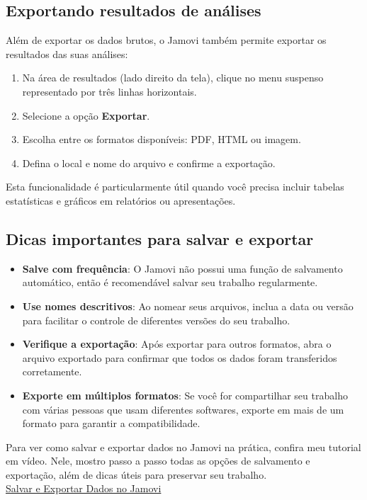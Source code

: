 \subsection{Exportando resultados de análises}

Além de exportar os dados brutos, o Jamovi também permite exportar os resultados das suas análises:

\begin{enumerate}
    \item Na área de resultados (lado direito da tela), clique no menu suspenso representado por três linhas horizontais.
    \item Selecione a opção \textbf{Exportar}.
    \item Escolha entre os formatos disponíveis: PDF, HTML ou imagem.
    \item Defina o local e nome do arquivo e confirme a exportação.
\end{enumerate}

Esta funcionalidade é particularmente útil quando você precisa incluir tabelas estatísticas e gráficos em relatórios ou apresentações.

\subsection{Dicas importantes para salvar e exportar}

\begin{itemize}
    \item \textbf{Salve com frequência}: O Jamovi não possui uma função de salvamento automático, então é recomendável salvar seu trabalho regularmente.
    \item \textbf{Use nomes descritivos}: Ao nomear seus arquivos, inclua a data ou versão para facilitar o controle de diferentes versões do seu trabalho.
    \item \textbf{Verifique a exportação}: Após exportar para outros formatos, abra o arquivo exportado para confirmar que todos os dados foram transferidos corretamente.
    \item \textbf{Exporte em múltiplos formatos}: Se você for compartilhar seu trabalho com várias pessoas que usam diferentes softwares, exporte em mais de um formato para garantir a compatibilidade.
\end{itemize}

\begin{tcolorbox}[colback=white,colframe=red,title={\faPlayCircle \ Dica de Conteúdo}]
  Para ver como salvar e exportar dados no Jamovi na prática, confira meu tutorial em vídeo. Nele, mostro passo a passo todas as opções de salvamento e exportação, além de dicas úteis para preservar seu trabalho.\\
  \textcolor{red}{\faYoutube} \href{https://youtu.be/NIpt0wIq5pc?si=cqwzo5swixILk2rU}{Salvar e Exportar Dados no Jamovi}
\end{tcolorbox}

